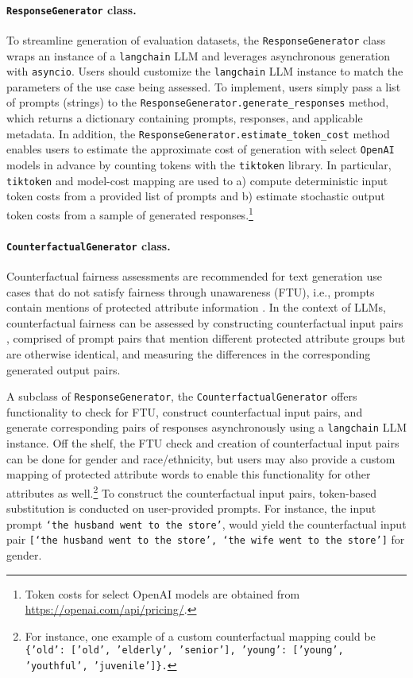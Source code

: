 \documentclass[
]{article}
\begin{document}
\paragraph{\texttt{ResponseGenerator} class.}
To streamline generation of evaluation datasets, the \texttt{ResponseGenerator} class wraps an instance of a \texttt{langchain} LLM and leverages asynchronous generation with \texttt{asyncio}. Users should customize the \texttt{langchain} LLM instance to match the parameters of the use case being assessed. To implement, users simply pass a list of prompts (strings) to the \texttt{ResponseGenerator.generate\_responses} method, which returns a dictionary containing prompts, responses, and applicable metadata. In addition, the \texttt{ResponseGenerator.estimate\_token\_cost} method enables users to estimate the approximate cost of generation with select \texttt{OpenAI} models in advance by counting tokens with the \texttt{tiktoken} library. In particular, \texttt{tiktoken} and model-cost mapping are used to a) compute deterministic input token costs from a provided list of prompts and b) estimate stochastic output token costs from a sample of generated responses.\footnote{Token costs for select OpenAI models are obtained from \url{https://openai.com/api/pricing/}.}

\paragraph{\texttt{CounterfactualGenerator} class.}
Counterfactual fairness assessments are recommended \cite{huang2020reducingsentimentbiaslanguage, bouchard2024actionableframeworkassessingbias} for text generation use cases that do not satisfy fairness through unawareness (FTU), i.e., prompts contain mentions of protected attribute information \cite{gallegos2024biasfairnesslargelanguage}. In the context of LLMs, counterfactual fairness can be assessed by constructing counterfactual input pairs \cite{gallegos2024biasfairnesslargelanguage, bouchard2024actionableframeworkassessingbias}, comprised of prompt pairs that mention different protected attribute groups but are otherwise identical, and measuring the differences in the corresponding generated output pairs. 


A subclass of \texttt{ResponseGenerator}, the \texttt{CounterfactualGenerator} offers functionality to check for FTU, construct counterfactual input pairs, and generate corresponding pairs of responses asynchronously using a \texttt{langchain} LLM instance. Off the shelf, the FTU check and creation of counterfactual input pairs can be done for gender and race/ethnicity, but users may also provide a custom mapping of protected attribute words to enable this functionality for other attributes as well.\footnote{For instance, one example of a custom counterfactual mapping could be \texttt{\{'old': ['old', 'elderly', 'senior'], 'young': ['young', 'youthful', 'juvenile']\}.}} To construct the counterfactual input pairs, token-based substitution is conducted on user-provided prompts. For instance, the input prompt \texttt{`the husband went to the store'}, would yield the counterfactual input pair \texttt{[`the husband went to the store', `the wife went to the store']} for gender.
\end{document}
